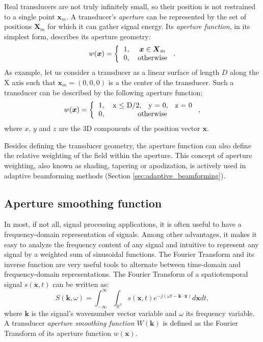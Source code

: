 Real transducers are not truly infinitely small, so their position is not restrained to a single point $\boldsymbol{x}_m$. A transducer's \textit{aperture} can be represented by the set of positions $\boldsymbol{X}_m$ for which it can gather signal energy. Its \textit{aperture function}, in its simplest form, describes its aperture geometry:
\begin{equation}
    w(\boldsymbol{x}) = \left \{ \begin{tabular}{cc}
        1, & $\boldsymbol{x} \in \boldsymbol{X}_m$ \\
        0, & otherwise
    \end{tabular}\right..
\end{equation}
\noindent
As example, let us consider a transducer as a linear surface of length $D$ along the X axis such that $\boldsymbol{x}_m = (0, 0, 0)$ is a the center of the transducer. Such a transducer can be described by the following aperture function:
\begin{equation}
    w(\boldsymbol{x}) = \left \{ \begin{tabular}{cc}
        1, & x $\leq$ D/2, ~ y = 0, ~ z = 0 \\
        0, & otherwise
    \end{tabular}\right.,
\label{eq:aperture_linear}
\end{equation}
\noindent
where $x$, $y$ and $z$ are the 3D components of the position vector $\boldsymbol{x}$.

Besides defining the transducer geometry, the aperture function can also define the relative weighting of the field within the aperture. This concept of aperture weighting, also known as shading, tapering or apodization, is actively used in adaptive beamforming methods (Section \ref{sec:adaptive_beamforming}).


\subsection{Aperture smoothing function}
\label{sec:aperture_smoothing}
In most, if not all, signal processing applications, it is often useful to have a frequency-domain representation of signals. Among other advantages, it makes it easy to analyze the frequency content of any signal and intuitive to represent any signal by a weighted sum of sinusoidal functions. The Fourier Transform and its inverse function are very useful tools to alternate between time-domain and frequency-domain representations. The Fourier Transform of a spatiotemporal signal $s(\boldsymbol{x},t)$ can be written as:
\begin{equation}
    S(\boldsymbol{k}, \omega) = \int_{-\infty}^{\infty} \int_{\mathbb{R}^3} s(\boldsymbol{x},t) e^{-j(\omega t - \boldsymbol{k} \cdot \boldsymbol{x})} d\boldsymbol{x} dt,
\end{equation}
\noindent
where $\boldsymbol{k}$ is the signal's wavenumber vector variable and $\omega$ its frequency variable. A transducer \textit{aperture smoothing function $W(\boldsymbol{k})$} is defined as the Fourier Transform of its aperture function $w(\boldsymbol{x})$.


